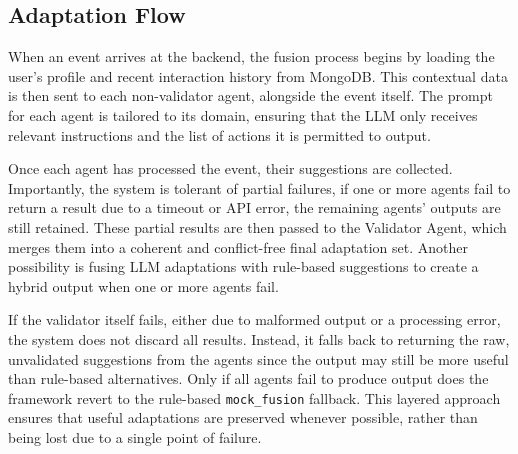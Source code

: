 \subsection{Adaptation Flow}
When an event arrives at the backend, the fusion process begins by loading the user’s profile and recent interaction history from MongoDB. This contextual data is then sent to each non-validator agent, alongside the event itself. The prompt for each agent is tailored to its domain, ensuring that the LLM only receives relevant instructions and the list of actions it is permitted to output.

Once each agent has processed the event, their suggestions are collected. Importantly, the system is tolerant of partial failures, if one or more agents fail to return a result due to a timeout or API error, the remaining agents’ outputs are still retained. These partial results are then passed to the Validator Agent, which merges them into a coherent and conflict-free final adaptation set. Another possibility is fusing LLM adaptations with rule-based suggestions to create a hybrid output when one or more agents fail.

If the validator itself fails, either due to malformed output or a processing error, the system does not discard all results. Instead, it falls back to returning the raw, unvalidated suggestions from the agents since the output may still be more useful than rule-based alternatives. Only if all agents fail to produce output does the framework revert to the rule-based \texttt{mock\_fusion} fallback. This layered approach ensures that useful adaptations are preserved whenever possible, rather than being lost due to a single point of failure.

